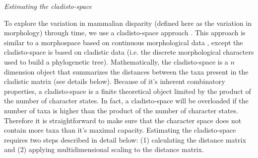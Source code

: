 \documentclass[12pt,letterpaper]{article}
\renewcommand{\subsection}[1]{%
\bigskip
\begin{center}
\begin{large}
\normalfont\itshape #1
\end{large}
\end{center}}
\begin{document}
\subsection{Estimating the cladisto-space}
To explore the variation in mammalian disparity (defined here as the variation in morphology) through time, we use a cladisto-space approach \citep{Foote01071994,Foote29111996,Wesley-Hunt2005,Brusatte12092008,Hughes20082013,friedmanexplosive2010,toljagictriassic-jurassic2013}.
This approach is similar to a morphospace based on continuous morphological data \citep[e.g.][]{friedmanexplosive2010,finlay2015morphological}, except the cladisto-space is based on cladistic data (i.e. the discrete morphological characters used to build a phylogenetic tree).
Mathematically, the cladisto-space is a $n$ dimension object that summarizes the distances between the taxa present in the cladistic matrix (see details below).
Because of it's inherent combinatory properties, a cladisto-space is a finite theoretical object limited by the product of the number of character states. In fact, a cladisto-space will be overloaded if the number of taxa is higher than the product of the number of character states. Therefore it is straightforward to make sure that the character space does not contain more taxa than it's maximal capacity.
Estimating the cladisto-space requires two steps described in detail below: (1) calculating the distance matrix and (2) applying multidimensional scaling to the distance matrix.
\end{document}
